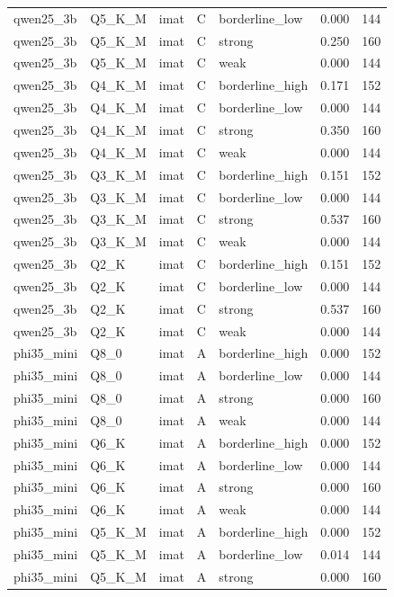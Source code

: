 \begin{tabular}{lllllrr}
qwen25\_3b & Q5\_K\_M & imat & C & borderline\_low & 0.000 & 144 \\
qwen25\_3b & Q5\_K\_M & imat & C & strong & 0.250 & 160 \\
qwen25\_3b & Q5\_K\_M & imat & C & weak & 0.000 & 144 \\
qwen25\_3b & Q4\_K\_M & imat & C & borderline\_high & 0.171 & 152 \\
qwen25\_3b & Q4\_K\_M & imat & C & borderline\_low & 0.000 & 144 \\
qwen25\_3b & Q4\_K\_M & imat & C & strong & 0.350 & 160 \\
qwen25\_3b & Q4\_K\_M & imat & C & weak & 0.000 & 144 \\
qwen25\_3b & Q3\_K\_M & imat & C & borderline\_high & 0.151 & 152 \\
qwen25\_3b & Q3\_K\_M & imat & C & borderline\_low & 0.000 & 144 \\
qwen25\_3b & Q3\_K\_M & imat & C & strong & 0.537 & 160 \\
qwen25\_3b & Q3\_K\_M & imat & C & weak & 0.000 & 144 \\
qwen25\_3b & Q2\_K & imat & C & borderline\_high & 0.151 & 152 \\
qwen25\_3b & Q2\_K & imat & C & borderline\_low & 0.000 & 144 \\
qwen25\_3b & Q2\_K & imat & C & strong & 0.537 & 160 \\
qwen25\_3b & Q2\_K & imat & C & weak & 0.000 & 144 \\
phi35\_mini & Q8\_0 & imat & A & borderline\_high & 0.000 & 152 \\
phi35\_mini & Q8\_0 & imat & A & borderline\_low & 0.000 & 144 \\
phi35\_mini & Q8\_0 & imat & A & strong & 0.000 & 160 \\
phi35\_mini & Q8\_0 & imat & A & weak & 0.000 & 144 \\
phi35\_mini & Q6\_K & imat & A & borderline\_high & 0.000 & 152 \\
phi35\_mini & Q6\_K & imat & A & borderline\_low & 0.000 & 144 \\
phi35\_mini & Q6\_K & imat & A & strong & 0.000 & 160 \\
phi35\_mini & Q6\_K & imat & A & weak & 0.000 & 144 \\
phi35\_mini & Q5\_K\_M & imat & A & borderline\_high & 0.000 & 152 \\
phi35\_mini & Q5\_K\_M & imat & A & borderline\_low & 0.014 & 144 \\
phi35\_mini & Q5\_K\_M & imat & A & strong & 0.000 & 160 \\

\end{tabular}
